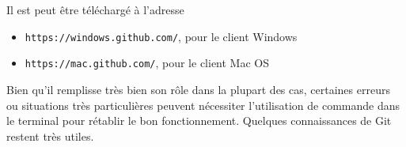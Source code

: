 \documentclass[11pt,a4paper]{article}
\begin{document}
Il est peut être téléchargé à l'adresse

\begin{itemize}
	\item {\tt https://windows.github.com/}, pour le client Windows
	\item {\tt https://mac.github.com/}, pour le client Mac OS
\end{itemize}

%


Bien qu'il remplisse très bien son rôle dans la plupart des cas, certaines erreurs ou situations très particulières peuvent nécessiter l'utilisation de commande dans le terminal pour rétablir le bon fonctionnement.
Quelques connaissances de Git restent très utiles.
\end{document}
